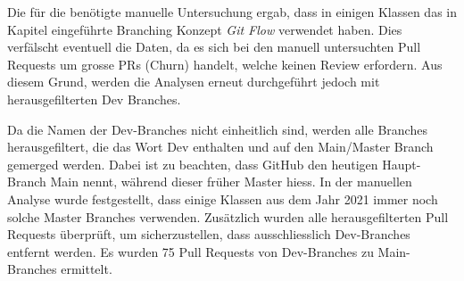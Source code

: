 Die für die  benötigte manuelle Untersuchung ergab, dass in einigen Klassen das in Kapitel  eingeführte Branching Konzept \textit{Git Flow} verwendet haben. Dies verfälscht eventuell die Daten, da es sich bei den manuell untersuchten Pull Requests um grosse PRs (Churn) handelt, welche keinen Review erfordern. Aus diesem Grund, werden die Analysen erneut durchgeführt jedoch mit herausgefilterten Dev Branches.

Da die Namen der Dev-Branches nicht einheitlich sind, werden alle Branches herausgefiltert, die das Wort Dev enthalten und auf den Main/Master Branch gemerged werden. Dabei ist zu beachten, dass GitHub den heutigen Haupt-Branch Main nennt, während dieser früher Master hiess. In der manuellen Analyse wurde festgestellt, dass einige Klassen aus dem Jahr 2021 immer noch solche Master Branches verwenden. Zusätzlich wurden alle herausgefilterten Pull Requests überprüft, um sicherzustellen, dass ausschliesslich Dev-Branches entfernt werden. Es wurden 75 Pull Requests von Dev-Branches zu Main-Branches ermittelt.




